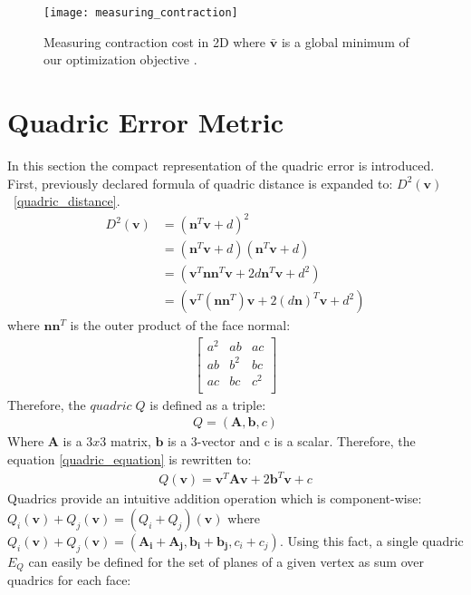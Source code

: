 \begin{figure}[H]
  \begin{center}
    \texttt{[image: measuring\_contraction]}
    \caption{Measuring contraction cost in 2D where $\bar{\mathbf{v}}$ is a global minimum of our optimization objective \cite{garland99}.}
    \label{fig:measuring_contraction_ref}
  \end{center}
\end{figure}

\section{Quadric Error Metric}

In this section the compact representation of the quadric error is introduced. First, previously declared formula of quadric distance is expanded to: $D^2(\mathbf{v})$~\ref{quadric_distance}.
\begin{align}
D^2(\mathbf{v})&=(\mathbf{n}^T\mathbf{v}+d)^2\\
	  &=(\mathbf{n}^T\mathbf{v}+d)(\mathbf{n}^T\mathbf{v}+d)\\
	  &=(\mathbf{v}^T\mathbf{n}\mathbf{n}^T\mathbf{v}+2d\mathbf{n}^T\mathbf{v}+d^2)\\
	  &=(\mathbf{v}^T(\mathbf{n}\mathbf{n}^T)\mathbf{v}+2(d\mathbf{n})^T\mathbf{v}+d^2)
	  \label{quadric_equation}
\end{align}
where $\mathbf{n}\mathbf{n}^T$ is the outer product of the face normal:
\begin{align}
\left[
\begin{array}{rrrr}
a^2 & ab & ac   \\
ab  & b^2 & bc  \\
ac  & bc  & c^2 \\
\end{array}\right]
\end{align}
Therefore, the $quadric\;Q$ is defined as a triple:
\begin{align}
Q = (\mathbf{A},\mathbf{b},c)
\end{align}
Where $\mathbf{A}$ is a $3x3$ matrix, $\mathbf{b}$ is a 3-vector and c is a scalar. Therefore, the equation \ref{quadric_equation} is rewritten to:
\begin{align}
Q(\mathbf{v}) = \mathbf{v}^T\mathbf{A}\mathbf{v} + 2\mathbf{b}^T\mathbf{v} + c
\end{align}
Quadrics provide an intuitive addition operation which is component-wise: $Q_i(\mathbf{v}) + Q_j(\mathbf{v}) = (Q_i + Q_j)(\mathbf{v})$ where $Q_i(\mathbf{v}) + Q_j(\mathbf{v}) = (\mathbf{A_i} + \mathbf{A_j}, \mathbf{b_i} + \mathbf{b_j}, c_i + c_j)$. Using this fact, a single quadric $E_Q$ can easily be defined for the set of planes of a given vertex \cite{garland99} as sum over quadrics for each face:
